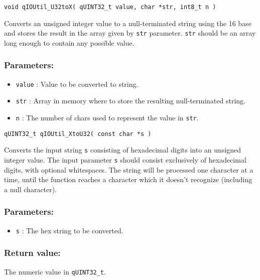 \noindent\hrulefill

\begin{lstlisting}[style=CStyle]
void qIOUtil_U32toX( qUINT32_t value, char *str, int8_t n )
\end{lstlisting}

Converts an unsigned integer value to a null-terminated string using the 16 base and stores the result in the array given by \lstinline{str} parameter. \lstinline{str} should be an array long enough to contain any possible value. 

\subsubsection*{Parameters:}
\begin{itemize}
    \item \lstinline{value} : Value to be converted to string.
    \item \lstinline{str} : Array in memory where to store the resulting null-terminated string.
    \item \lstinline{n} : The number of chars used to represent the value in \lstinline{str}. 
\end{itemize}


\noindent\hrulefill

\begin{lstlisting}[style=CStyle]
qUINT32_t qIOUtil_XtoU32( const char *s )
\end{lstlisting}

Converts the input string \lstinline{s} consisting of hexadecimal digits into an unsigned 
integer value. The input parameter \lstinline{s} should consist exclusively of hexadecimal 
digits, with optional whitespaces. The string will be processed one character at
a time, until the function reaches a character which it doesn't recognize
(including a null character). 
 
\subsubsection*{Parameters:}
\begin{itemize}
    \item \lstinline{s} : The hex string to be converted.
\end{itemize}

\subsubsection*{Return value:}
The numeric value in \lstinline{qUINT32_t}.


